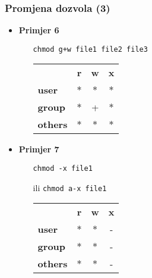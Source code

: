 \documentclass[table,usenames,dvipsnames] {beamer}
\newcommand{\shell}[1]{\texttt{#1}}
\begin{document}
\begin{frame}[t]
  \frametitle{Promjena dozvola (3)}
\begin{itemize}
  \item \textbf{Primjer 6}
  \begin{itemize}
      \item[] \shell{chmod g+w file1 file2 file3}
      \item[] \hspace{1em} \begin{tabular}{l c c c}
      & \textbf{r} & \textbf{w} & \textbf{x}\\
      \textbf{user} & $\ast$ & $\ast$ & $\ast$\\
      \textbf{group} & $\ast$ & + & $\ast$\\
      \textbf{others} & $\ast$ & $\ast$ & $\ast$
    \end{tabular}
    \end{itemize}
  \item \textbf{Primjer 7}
  \begin{itemize}
      \item[] \shell{chmod -x file1} 
      \item[ili] \shell{chmod a-x file1}
      \item[] \hspace{1em} \begin{tabular}{l c c c}
            & \textbf{r} & \textbf{w} & \textbf{x}\\
            \textbf{user} & $\ast$ & $\ast$ & -\\
            \textbf{group} & $\ast$ & $\ast$ & -\\
            \textbf{others} & $\ast$ & $\ast$ & -
          \end{tabular}
    \end{itemize}
\end{itemize}
\end{frame}


\end{document}
